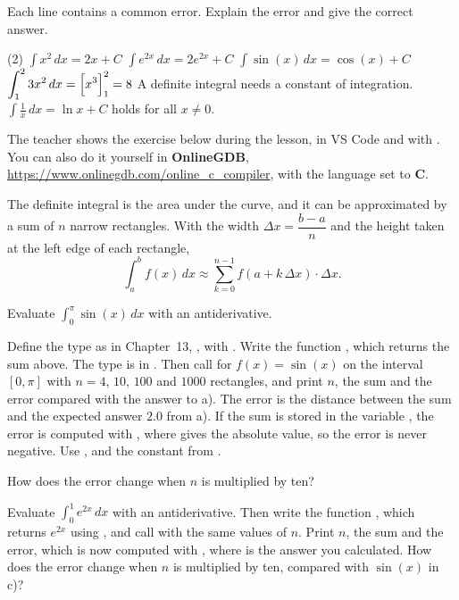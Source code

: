 Each line contains a common error. Explain the error and give the correct answer.
\begin{delar}(2)
  \task $\displaystyle\int x^2\,dx = 2x + C$
  \task $\displaystyle\int e^{2x}\,dx = 2e^{2x} + C$
  \task $\displaystyle\int \sin(x)\,dx = \cos(x) + C$
  \task $\displaystyle\int_1^2 3x^2\,dx = \Bigl[x^3\Bigr]_1^2 = 8$
  \task* A definite integral needs a constant of integration.
  \task* $\displaystyle\int \frac{1}{x}\,dx = \ln x + C$ holds for all $x \neq 0$.
\end{delar}

The teacher shows the exercise below during the lesson, in VS Code and with . You can
also do it yourself in \textbf{OnlineGDB}, \url{https://www.onlinegdb.com/online_c_compiler}, with
the language set to \textbf{C}.

The definite integral is the area under the curve, and it can be approximated by a sum of $n$
narrow rectangles. With the width $\Delta x = \dfrac{b - a}{n}$ and the height taken at the left
edge of each rectangle,
\[
  \int_a^b f(x)\,dx \approx \sum_{k=0}^{n-1} f(a + k\,\Delta x) \cdot \Delta x.
\]
\begin{parts}
  \item Evaluate $\displaystyle\int_0^{\pi} \sin(x)\,dx$ with an antiderivative.
  \item Define the type  as in Chapter~13, , with
    . Write the function
    , which returns the sum
    above. The type  is in . Then call
     for $f(x) = \sin(x)$ on the interval $[0, \pi]$ with
    $n = 4$, $10$, $100$ and $1000$ rectangles, and print $n$, the sum and the error compared with
    the answer to a). The error is the distance between the sum and the expected answer $2.0$ from
    a). If the sum is stored in the variable , the error is computed with
    , where  gives the absolute value, so the error is never
    negative. Use ,  and the constant  from .
  \item How does the error change when $n$ is multiplied by ten?
  \item Evaluate $\displaystyle\int_0^{1} e^{2x}\,dx$ with an antiderivative. Then write the
    function , which returns $e^{2x}$ using
    , and call  with the same values of
    $n$. Print $n$, the sum and the error, which is now computed with ,
    where  is the answer you calculated. How does the error change when $n$ is
    multiplied by ten, compared with $\sin(x)$ in c)?
\end{parts}
